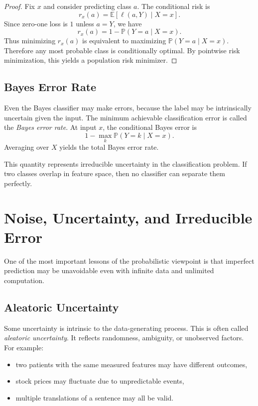 \begin{proof}
Fix $x$ and consider predicting class $a$. The conditional risk is
\[
r_x(a)=\mathbb{E}[\ell(a,Y)\mid X=x].
\]
Since zero-one loss is $1$ unless $a=Y$, we have
\[
r_x(a)=1-\mathbb{P}(Y=a\mid X=x).
\]
Thus minimizing $r_x(a)$ is equivalent to maximizing $\mathbb{P}(Y=a\mid X=x)$. Therefore any most probable class is conditionally optimal. By pointwise risk minimization, this yields a population risk minimizer.
\end{proof}

\subsection{Bayes Error Rate}

Even the Bayes classifier may make errors, because the label may be intrinsically uncertain given the input. The minimum achievable classification error is called the \emph{Bayes error rate}. At input $x$, the conditional Bayes error is
\[
1 - \max_k \mathbb{P}(Y=k\mid X=x).
\]
Averaging over $X$ yields the total Bayes error rate.

This quantity represents irreducible uncertainty in the classification problem. If two classes overlap in feature space, then no classifier can separate them perfectly.

\section{Noise, Uncertainty, and Irreducible Error}

One of the most important lessons of the probabilistic viewpoint is that imperfect prediction may be unavoidable even with infinite data and unlimited computation.

\subsection{Aleatoric Uncertainty}

Some uncertainty is intrinsic to the data-generating process. This is often called \emph{aleatoric uncertainty}. It reflects randomness, ambiguity, or unobserved factors. For example:
\begin{itemize}
    \item two patients with the same measured features may have different outcomes,
    \item stock prices may fluctuate due to unpredictable events,
    \item multiple translations of a sentence may all be valid.
\end{itemize}

